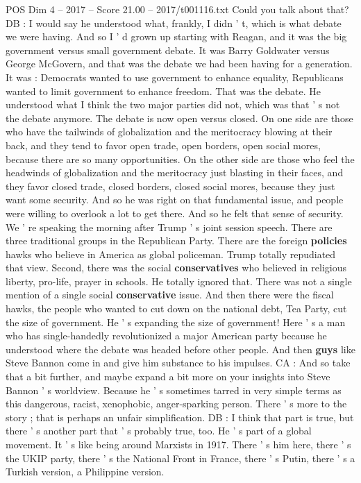 \begin{textsample}{POS Dim 4 – 2017 – Score 21.00 – 2017/t001116.txt}
Could you talk about that?
DB : I would say he understood what, frankly, I didn ' t, which is what debate we were having.
And so I ' d grown up starting with Reagan, and it was the big government versus small government debate.
It was Barry Goldwater versus George McGovern, and that was the debate we had been having for a generation.
It was : Democrats wanted to use government to enhance equality, Republicans wanted to limit government to enhance freedom.
That was the debate.
He understood what I think the two major parties did not, which was that ' s not the debate anymore.
The debate is now open versus closed.
On one side are those who have the tailwinds of globalization and the meritocracy blowing at their back, and they tend to favor open trade, open borders, open social mores, because there are so many opportunities.
On the other side are those who feel the headwinds of globalization and the meritocracy just blasting in their faces, and they favor closed trade, closed borders, closed social mores, because they just want some security.
And so he was right on that fundamental issue, and people were willing to overlook a lot to get there.
And so he felt that sense of security.
We ' re speaking the morning after Trump ' s joint session speech.
There are three traditional groups in the Republican Party.
There are the foreign \textbf{policies} hawks who believe in America as global policeman.
Trump totally repudiated that view.
Second, there was the social \textbf{conservatives} who believed in religious liberty, pro-life, prayer in schools.
He totally ignored that.
There was not a single mention of a single social \textbf{conservative} issue.
And then there were the fiscal hawks, the people who wanted to cut down on the national debt, Tea Party, cut the size of government.
He ' s expanding the size of government!
Here ' s a man who has single-handedly revolutionized a major American party because he understood where the debate was headed before other people.
And then \textbf{guys} like Steve Bannon come in and give him substance to his impulses.
CA : And so take that a bit further, and maybe expand a bit more on your insights into Steve Bannon ' s worldview.
Because he ' s sometimes tarred in very simple terms as this dangerous, racist, xenophobic, anger-sparking person.
There ' s more to the story ; that is perhaps an unfair simplification.
DB : I think that part is true, but there ' s another part that ' s probably true, too.
He ' s part of a global movement.
It ' s like being around Marxists in 1917.
There ' s him here, there ' s the UKIP party, there ' s the National Front in France, there ' s Putin, there ' s a Turkish version, a Philippine version.

\end{textsample}
